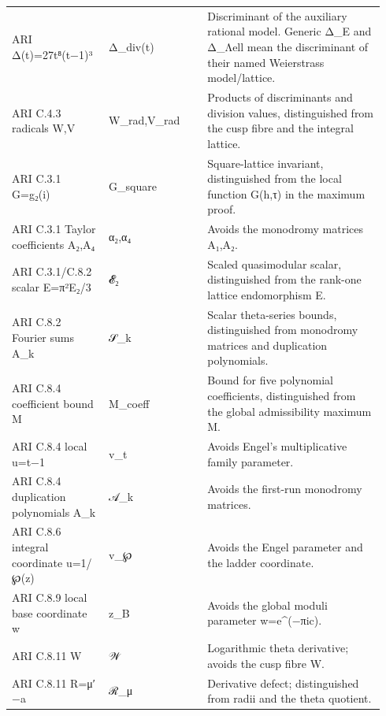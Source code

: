 \begin{longtable}{@{}L{0.24\linewidth}L{0.25\linewidth}L{0.45\linewidth}@{}}
ARI Δ(t)=27t⁸(t−1)³ & Δ\_\allowbreak{}div(t) & Discriminant of the auxiliary rational model. Generic Δ\_\allowbreak{}E and Δ\_\allowbreak{}Λell mean the discriminant of their named Weierstrass model/\allowbreak{}lattice.\\
ARI C.4.3 radicals W,V & W\_\allowbreak{}rad,V\_\allowbreak{}rad & Products of discriminants and division values, distinguished from the cusp fibre and the integral lattice.\\
ARI C.3.1 G=g₂(i) & G\_\allowbreak{}square & Square-lattice invariant, distinguished from the local function G(h,τ) in the maximum proof.\\
ARI C.3.1 Taylor coefficients A₂,A₄ & α₂,α₄ & Avoids the monodromy matrices A₁,A₂.\\
ARI C.3.1/\allowbreak{}C.8.2 scalar E=π²E₂/\allowbreak{}3 & 𝓔₂ & Scaled quasimodular scalar, distinguished from the rank-one lattice endomorphism E.\\
ARI C.8.2 Fourier sums A\_\allowbreak{}k & 𝒮\_\allowbreak{}k & Scalar theta-series bounds, distinguished from monodromy matrices and duplication polynomials.\\
ARI C.8.4 coefficient bound M & M\_\allowbreak{}coeff & Bound for five polynomial coefficients, distinguished from the global admissibility maximum M.\\
ARI C.8.4 local u=t−1 & v\_\allowbreak{}t & Avoids Engel's multiplicative family parameter.\\
ARI C.8.4 duplication polynomials A\_\allowbreak{}k & 𝒜\_\allowbreak{}k & Avoids the first-run monodromy matrices.\\
ARI C.8.6 integral coordinate u=1/\allowbreak{}℘(z) & v\_\allowbreak{}℘ & Avoids the Engel parameter and the ladder coordinate.\\
ARI C.8.9 local base coordinate w & z\_\allowbreak{}B & Avoids the global moduli parameter w=e\textasciicircum{}(−πic).\\
ARI C.8.11 W & 𝒲 & Logarithmic theta derivative; avoids the cusp fibre W.\\
ARI C.8.11 R=μ′−a & ℛ\_\allowbreak{}μ & Derivative defect; distinguished from radii and the theta quotient.\\
\bottomrule\end{longtable}\endgroup
